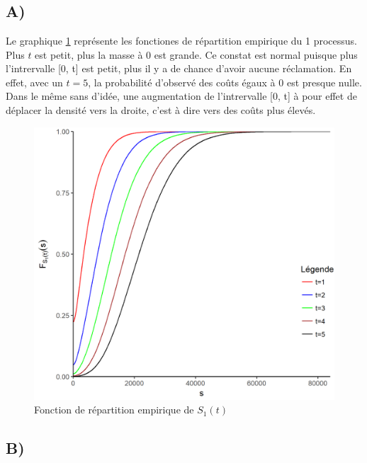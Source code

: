 \documentclass[12pt, french]{report}
\begin{document}
\section{}
\subsection*{A)}
\label{SEC: repartition}
Le graphique \ref{GRAPH:Repartition empirique processus 1} représente les fonctiones de répartition empirique du 1 processus. Plus $t$ est petit, plus 
la masse à 0 est grande. Ce constat est normal puisque plus l'intrervalle [0, t] est petit, plus il y a de chance d'avoir aucune réclamation. En effet, avec un
$t = 5$, la probabilité d'observé des coûts égaux à 0 est presque nulle. Dans le même sans d'idée, une augmentation de l'intrervalle [0, t] à pour effet de 
déplacer la densité vers la droite, c'est à dire vers des coûts plus élevés.
\begin{figure}[!ht]
    \centering
    \caption{Fonction de répartition empirique de $S_1(t)$}
    \label{GRAPH:Repartition empirique processus 1}
    \includegraphics[scale=0.7]{Graphiques/empirique_Fn_S_1.png}
\end{figure}

\subsection*{B)}
\end{document}
